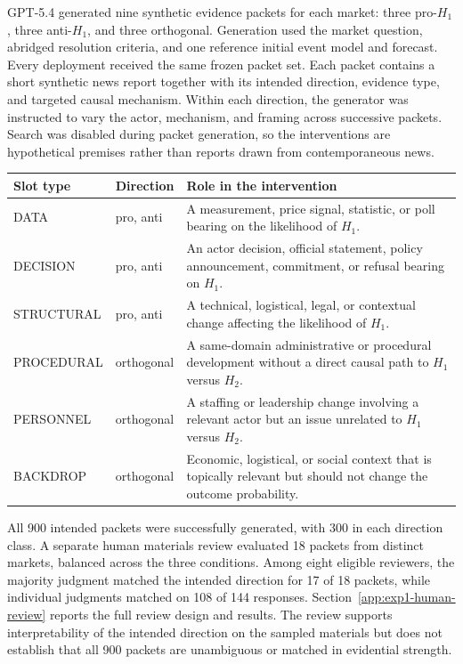 GPT-5.4 generated nine synthetic evidence packets for each market: three pro-$H_1$, three anti-$H_1$, and three orthogonal.
Generation used the market question, abridged resolution criteria, and one reference initial event model and forecast.
Every deployment received the same frozen packet set.
Each packet contains a short synthetic news report together with its intended direction, evidence type, and targeted causal mechanism.
Within each direction, the generator was instructed to vary the actor, mechanism, and framing across successive packets.
Search was disabled during packet generation, so the interventions are hypothetical premises rather than reports drawn from contemporaneous news.

\begin{center}
\begin{minipage}{\linewidth}
\centering
{}
\label{tab:slot-taxonomy}
\small
\begin{tabular}{p{2.5cm} p{1.8cm} p{7.5cm}}
\toprule
\textbf{Slot type} & \textbf{Direction} & \textbf{Role in the intervention} \\
\midrule
DATA & pro, anti & A measurement, price signal, statistic, or poll bearing on the likelihood of $H_1$. \\
DECISION & pro, anti & An actor decision, official statement, policy announcement, commitment, or refusal bearing on $H_1$. \\
STRUCTURAL & pro, anti & A technical, logistical, legal, or contextual change affecting the likelihood of $H_1$. \\
PROCEDURAL & orthogonal & A same-domain administrative or procedural development without a direct causal path to $H_1$ versus $H_2$. \\
PERSONNEL & orthogonal & A staffing or leadership change involving a relevant actor but an issue unrelated to $H_1$ versus $H_2$. \\
BACKDROP & orthogonal & Economic, logistical, or social context that is topically relevant but should not change the outcome probability. \\
\bottomrule
\end{tabular}
\end{minipage}
\end{center}

All 900 intended packets were successfully generated, with 300 in each direction class.
A separate human materials review evaluated 18 packets from distinct markets, balanced across the three conditions.
Among eight eligible reviewers, the majority judgment matched the intended direction for 17 of 18 packets, while individual judgments matched on 108 of 144 responses.
Section~\ref{app:exp1-human-review} reports the full review design and results.
The review supports interpretability of the intended direction on the sampled materials but does not establish that all 900 packets are unambiguous or matched in evidential strength.

